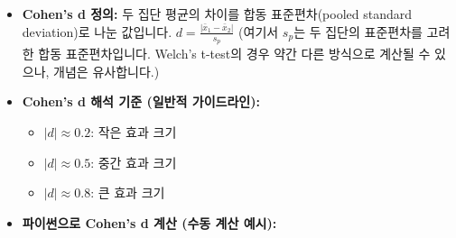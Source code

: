 \documentclass[
  letterpaper,
]{book}
\providecommand{\tightlist}{%
  \setlength{\itemsep}{0pt}\setlength{\parskip}{0pt}}
\begin{document}
\begin{itemize}
\item
  \textbf{Cohen's d 정의:} 두 집단 평균의 차이를 합동 표준편차(pooled
  standard deviation)로 나눈 값입니다.
  \(d = \frac{|\bar{x}_1 - \bar{x}_2|}{s_p}\) (여기서 \(s_p\)는 두
  집단의 표준편차를 고려한 합동 표준편차입니다. Welch's t-test의 경우
  약간 다른 방식으로 계산될 수 있으나, 개념은 유사합니다.)
\item
  \textbf{Cohen's d 해석 기준 (일반적 가이드라인):}

  \begin{itemize}
  \tightlist
  \item
    \(|d| \approx 0.2\): 작은 효과 크기
  \item
    \(|d| \approx 0.5\): 중간 효과 크기
  \item
    \(|d| \approx 0.8\): 큰 효과 크기
  \end{itemize}
\item
  \textbf{파이썬으로 Cohen's d 계산 (수동 계산 예시):}
\end{itemize}
\end{document}
